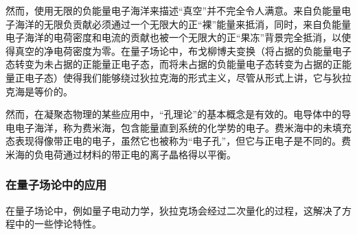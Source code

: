 然而，使用无限的负能量电子海洋来描述“真空”并不完全令人满意。来自负能量电子海洋的无限负贡献必须通过一个无限大的正“裸”能量来抵消，同时，来自负能量电子海洋的电荷密度和电流的贡献也被一个无限大的正“果冻”背景完全抵消，以使得真空的净电荷密度为零。在量子场论中，布戈柳博夫变换（将占据的负能量电子态转变为未占据的正能量正电子态，而将未占据的负能量电子态转变为占据的正能量正电子态）使得我们能够绕过狄拉克海的形式主义，尽管从形式上讲，它与狄拉克海是等价的。

然而，在凝聚态物理的某些应用中，“孔理论”的基本概念是有效的。电导体中的导电电子海洋，称为费米海，包含能量直到系统的化学势的电子。费米海中的未填充态表现得像带正电的电子，虽然它也被称为“电子孔”，但它与正电子是不同的。费米海的负电荷通过材料的带正电的离子晶格得以平衡。
\subsubsection{在量子场论中的应用}
在量子场论中，例如量子电动力学，狄拉克场会经过二次量化的过程，这解决了方程中的一些悖论特性。
